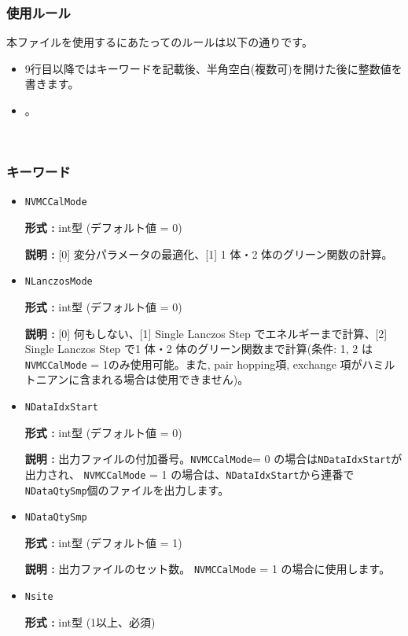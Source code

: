 \subsubsection{使用ルール}
本ファイルを使用するにあたってのルールは以下の通りです。
\begin{itemize}
\item 9行目以降ではキーワードを記載後、半角空白(複数可)を開けた後に整数値を書きます。
\item {}。
\end{itemize}

~\subsubsection{キーワード}
 \begin{itemize}
 
 \item  \verb|NVMCCalMode|

 {\bf 形式 :} int型 (デフォルト値 = 0)

{\bf 説明 :} [0] 変分パラメータの最適化、[1] 1 体・2 体のグリーン関数の計算。
 
 \item  \verb|NLanczosMode|

 {\bf 形式 :} int型 (デフォルト値 = 0)

{\bf 説明 :} [0] 何もしない、[1] Single Lanczos Step でエネルギーまで計算、[2] Single Lanczos Step で1 体・2 体のグリーン関数まで計算(条件: 1, 2 は\verb|NVMCCalMode| = 1のみ使用可能。また, pair hopping項, exchange 項がハミルトニアンに含まれる場合は使用できません)。
 
 \item  \verb|NDataIdxStart|

 {\bf 形式 :} int型 (デフォルト値 = 0)

{\bf 説明 :} 出力ファイルの付加番号。\verb|NVMCCalMode|= 0 の場合は\verb|NDataIdxStart|が出力され、 \verb|NVMCCalMode| = 1 の場合は、\verb|NDataIdxStart|から連番で\verb|NDataQtySmp|個のファイルを出力します。
   
 \item  \verb|NDataQtySmp|

 {\bf 形式 :} int型 (デフォルト値 = 1)

{\bf 説明 :} 出力ファイルのセット数。 \verb|NVMCCalMode| = 1 の場合に使用します。

 \item  \verb|Nsite|

{\bf 形式 :} int型 (1以上、必須)


\end{itemize}
